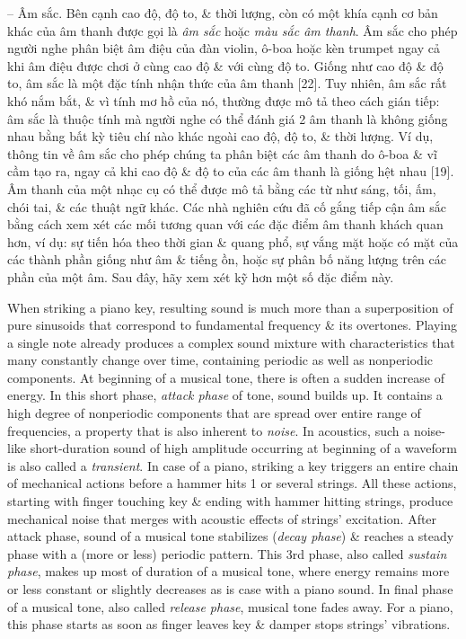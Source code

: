 \documentclass{article}
\begin{document}
\begin{itemize}
\begin{itemize}
\begin{itemize}
			-- {\sf Âm sắc.} Bên cạnh cao độ, độ to, \& thời lượng, còn có một khía cạnh cơ bản khác của âm thanh được gọi là {\it âm sắc} hoặc {\it màu sắc âm thanh}. Âm sắc cho phép người nghe phân biệt âm điệu của đàn violin, ô-boa hoặc kèn trumpet ngay cả khi âm điệu được chơi ở cùng cao độ \& với cùng độ to. Giống như cao độ \& độ to, âm sắc là một đặc tính nhận thức của âm thanh [22]. Tuy nhiên, âm sắc rất khó nắm bắt, \& vì tính mơ hồ của nó, thường được mô tả theo cách gián tiếp: âm sắc là thuộc tính mà người nghe có thể đánh giá 2 âm thanh là không giống nhau bằng bất kỳ tiêu chí nào khác ngoài cao độ, độ to, \& thời lượng. Ví dụ, thông tin về âm sắc cho phép chúng ta phân biệt các âm thanh do ô-boa \& vĩ cầm tạo ra, ngay cả khi cao độ \& độ to của các âm thanh là giống hệt nhau [19]. Âm thanh của một nhạc cụ có thể được mô tả bằng các từ như sáng, tối, ấm, chói tai, \& các thuật ngữ khác. Các nhà nghiên cứu đã cố gắng tiếp cận âm sắc bằng cách xem xét các mối tương quan với các đặc điểm âm thanh khách quan hơn, ví dụ: sự tiến hóa theo thời gian \& quang phổ, sự vắng mặt hoặc có mặt của các thành phần giống như âm \& tiếng ồn, hoặc sự phân bố năng lượng trên các phần của một âm. Sau đây, hãy xem xét kỹ hơn một số đặc điểm này.
			
			When striking a piano key, resulting sound is much more than a superposition of pure sinusoids that correspond to fundamental frequency \& its overtones. Playing a single note already produces a complex sound mixture with characteristics that many constantly change over time, containing periodic as well as nonperiodic components. At beginning of a musical tone, there is often a sudden increase of energy. In this short phase, {\it attack phase} of tone, sound builds up. It contains a high degree of nonperiodic components that are spread over entire range of frequencies, a property that is also inherent to {\it noise}. In acoustics, such a noise-like short-duration sound of high amplitude occurring at beginning of a waveform is also called a {\it transient}. In case of a piano, striking a key triggers an entire chain of mechanical actions before a hammer hits 1 or several strings. All these actions, starting with finger touching key \& ending with hammer hitting strings, produce mechanical noise that merges with acoustic effects of strings' excitation. After attack phase, sound of a musical tone stabilizes ({\it decay phase}) \& reaches a steady phase with a (more or less) periodic pattern. This 3rd phase, also called {\it sustain phase}, makes up most of duration of a musical tone, where energy remains more or less constant or slightly decreases as is case with a piano sound. In final phase of a musical tone, also called {\it release phase}, musical tone fades away. For a piano, this phase starts as soon as finger leaves key \& damper stops strings' vibrations.
			

\end{itemize}
\end{itemize}
\end{itemize}
\end{document}
